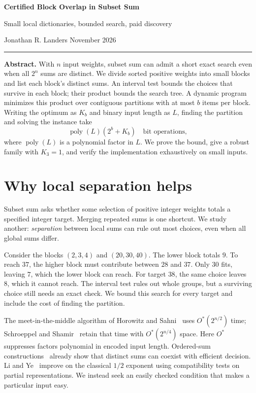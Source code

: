 \documentclass[10pt]{article}
\newcommand{\poly}{\operatorname{poly}}
\begin{document}
{\LARGE\sffamily\bfseries Certified Block Overlap in Subset Sum}\par
\vspace{3pt}
{\large\sffamily Small local dictionaries, bounded search, paid discovery}\par
\vspace{5pt}
{\small Jonathan R. Landers \hfill November 2026}\par
\textcolor{rulecolor}{\rule{\linewidth}{.6pt}}

\textbf{Abstract.}
With $n$ input weights, subset sum can admit a short exact search even when
all $2^n$ sums are distinct. We divide sorted positive weights into small blocks and list each
block's distinct sums. An interval test bounds the choices that survive in
each block; their product bounds the search tree. A dynamic program minimizes
this product over contiguous partitions with at most $b$ items per block.
Writing the optimum as $K_b$ and binary input length as $L$, finding the
partition and solving the instance take
\[
 \poly(L)(2^b+K_b)\quad\text{bit operations},
\]
where $\poly(L)$ is a polynomial factor in $L$.
We prove the bound, give a robust family with $K_3=1$, and verify the
implementation exhaustively on small inputs.

\section{Why local separation helps}
Subset sum asks whether some selection of positive integer weights totals a
specified integer target. Merging repeated sums is one shortcut.
We study another: \emph{separation} between local sums can rule out most
choices, even when all global sums differ.

Consider the blocks $(2,3,4)$ and $(20,30,40)$. The lower block totals $9$.
To reach $37$, the higher block must contribute between $28$ and $37$.
Only $30$ fits, leaving $7$, which the lower block can reach.
For target $38$, the same choice leaves $8$, which it cannot reach.
The interval test rules out whole groups, but a surviving choice still
needs an exact check. We bound this search for every target and include
the cost of finding the partition.

The meet-in-the-middle algorithm of Horowitz and Sahni~\cite{hs}
uses $O^*(2^{n/2})$ time; Schroeppel and Shamir~\cite{ss} retain that time
with $O^*(2^{n/4})$ space. Here $O^*$ suppresses factors polynomial in
encoded input length. Ordered-sum constructions~\cite{ordered} already show
that distinct sums can coexist with efficient decision.
Li and Ye~\cite{partial} improve on the classical $1/2$ exponent using
compatibility tests on partial representations. We instead seek an
easily checked condition that makes a particular input easy.
\end{document}
